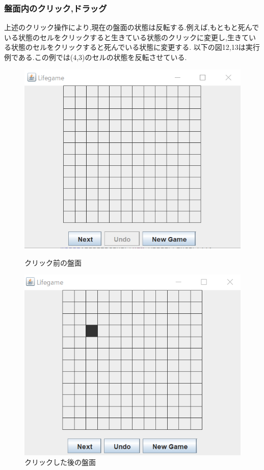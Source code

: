 \documentclass[dvipdfmx]{jarticle}
\begin{document}
\subsubsection{盤面内のクリック,ドラッグ}
上述のクリック操作により,現在の盤面の状態は反転する.例えば,もともと死んでいる状態のセルをクリックすると生きている状態のクリックに変更し,生きている状態のセルをクリックすると死んでいる状態に変更する.
以下の図12,13は実行例である.この例では(4,3)のセルの状態を反転させている.
\begin{figure}[htbp]
    \begin{minipage}[b]{0.45\linewidth}
      \centering
      \includegraphics[keepaspectratio, scale=0.4]{panel_normal.png}
      \caption{クリック前の盤面}
    \end{minipage}
    \begin{minipage}[b]{0.45\linewidth}
      \centering
      \includegraphics[keepaspectratio, scale=0.4]{panel_click.png}
      \caption{クリックした後の盤面}
    \end{minipage}
  \end{figure}
\end{document}
